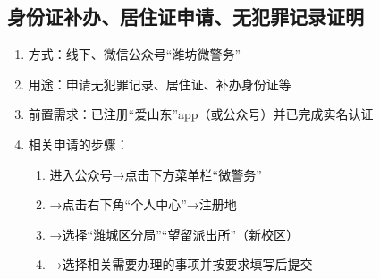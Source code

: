 \subsection[身份证补办、居住证申请、无犯罪记录证明]{身份证补办、居住证申请、无犯罪记录证明}
\begin{enumerate}
    \item 方式：线下、微信公众号“潍坊微警务”
    \item 用途：申请无犯罪记录、居住证、补办身份证等
    \item 前置需求：已注册“爱山东”app（或公众号）并已完成实名认证
    \item 相关申请的步骤：
          \begin{enumerate}
              \item 进入公众号→点击下方菜单栏“微警务”
              \item →点击右下角“个人中心”→注册地
              \item →选择“潍城区分局”“望留派出所”（新校区）
              \item →选择相关需要办理的事项并按要求填写后提交
          \end{enumerate}
\end{enumerate}
